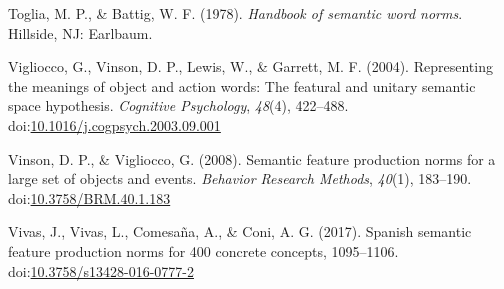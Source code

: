 \documentclass[english,man]{apa6}
\theoremstyle{definition}
\theoremstyle{definition}
\theoremstyle{definition}
\theoremstyle{remark}
\begin{document}
\hypertarget{ref-Toglia1978}{}
Toglia, M. P., \& Battig, W. F. (1978). \emph{Handbook of semantic word
norms}. Hillside, NJ: Earlbaum.

\hypertarget{ref-Vigliocco2004}{}
Vigliocco, G., Vinson, D. P., Lewis, W., \& Garrett, M. F. (2004).
Representing the meanings of object and action words: The featural and
unitary semantic space hypothesis. \emph{Cognitive Psychology},
\emph{48}(4), 422--488.
doi:\href{https://doi.org/10.1016/j.cogpsych.2003.09.001}{10.1016/j.cogpsych.2003.09.001}

\hypertarget{ref-Vinson2008}{}
Vinson, D. P., \& Vigliocco, G. (2008). Semantic feature production
norms for a large set of objects and events. \emph{Behavior Research
Methods}, \emph{40}(1), 183--190.
doi:\href{https://doi.org/10.3758/BRM.40.1.183}{10.3758/BRM.40.1.183}

\hypertarget{ref-Vivas2017}{}
Vivas, J., Vivas, L., Comesaña, A., \& Coni, A. G. (2017). Spanish
semantic feature production norms for 400 concrete concepts, 1095--1106.
doi:\href{https://doi.org/10.3758/s13428-016-0777-2}{10.3758/s13428-016-0777-2}
\end{document}
